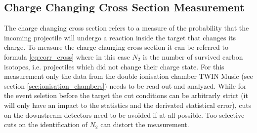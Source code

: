 \subsection{Charge Changing Cross Section Measurement}\label{subsec:cc_cs}
The charge changing cross section refers to a measure of the probability that the incoming projectile will undergo a reaction inside the target that changes its charge. To measure the charge changing cross section it can be referred to formula \ref{eq:corr_cross} where in this case $N_2$ is the number of survived carbon isotopes, i.e. projectiles which did not change their charge state. For this measurement only the data from the double ionisation chamber TWIN Music (see section \ref{sec:ionisation_chambers}) needs to be read out and analyzed.\newline
While for the event seletion before the target the cut conditions can be arbitrarly strict (it will only have an impact to the statistics and the derivated statistical error), cuts on the downstream detectors need to be avoided if at all possible. Too selective cuts on the identification of $N_2$ can distort the measurement.
